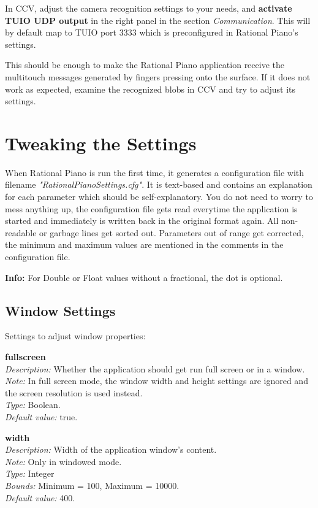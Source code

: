 \documentclass[12pt,a4paper,titlepage,oneside]{report}
\begin{document}
In CCV, adjust the camera recognition settings to your needs, and \textbf{activate TUIO UDP output} in the right panel in the section \textit{Communication}. This will by default map to TUIO port 3333 which is preconfigured in Rational Piano's settings.

This should be enough to make the Rational Piano application receive the multitouch messages generated by fingers pressing onto the surface. If it does not work as expected, examine the recognized blobs in CCV and try to adjust its settings.


\chapter{Tweaking the Settings}
\label{chap:settings}

When Rational Piano is run the first time, it generates a configuration file with filename \textit{"RationalPianoSettings.cfg"}. It is text-based and contains an explanation for each parameter which should be self-explanatory. You do not need to worry to mess anything up, the configuration file gets read everytime the application is started and immediately is written back in the original format again. All non-readable or garbage lines get sorted out. Parameters out of range get corrected, the minimum and maximum values are mentioned in the comments in the configuration file.

\textbf{Info:} For Double or Float values without a fractional, the dot is optional.

\section{Window Settings}

Settings to adjust window properties:

\noindent
\textbf{fullscreen} \\
\textit{Description:} Whether the application should get run full screen or in a window. \\
\textit{Note:} In full screen mode, the window width and height settings are ignored and the screen resolution is used instead. \\
\textit{Type:} Boolean. \\
\textit{Default value:} true.

\noindent
\textbf{width} \\
\textit{Description:} Width of the application window's content. \\
\textit{Note:} Only in windowed mode. \\
\textit{Type:} Integer \\
\textit{Bounds:} Minimum = 100, Maximum = 10000. \\
\textit{Default value:} 400.
\end{document}
